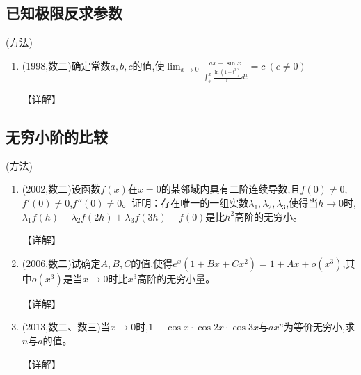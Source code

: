 \documentclass[12pt, a4paper, oneside, UTF8]{ctexbook}
\begin{document}
\subsection{已知极限反求参数}
\begin{remark}(方法)

\end{remark}

\begin{enumerate}[label=\arabic*.,start=11]
    \item  (1998,数二)确定常数$a,b,c$的值,使$\lim_{x\to0}\frac{ax-\sin x}{\int_b^x\frac{\ln(1+t^3)}{t}dt}=c\ (c\neq0)$
    
    \begin{solution}
    【详解】
    \end{solution}
\end{enumerate}

\subsection{无穷小阶的比较}
\begin{remark}(方法)
\end{remark}
\begin{enumerate}[label=\arabic*.,start=12]
    \item  (2002,数二)设函数$f(x)$在$x=0$的某邻域内具有二阶连续导数,且$f(0)\neq0$,$f'(0)\neq0$,$f''(0)\neq0$。证明：存在唯一的一组实数$\lambda_1,\lambda_2,\lambda_3$,使得当$h\to0$时,$\lambda_1f(h)+\lambda_2f(2h)+\lambda_3f(3h)-f(0)$是比$h^2$高阶的无穷小。
    
    \begin{solution}
    【详解】
    \end{solution}
    
    \item  (2006,数二)试确定$A,B,C$的值,使得$e^x(1+Bx+Cx^2)=1+Ax+o(x^3)$,其中$o(x^3)$是当$x\to0$时比$x^3$高阶的无穷小量。
    
    \begin{solution}
    【详解】
    \end{solution}
    
    \item  (2013,数二、数三)当$x\to0$时,$1-\cos x\cdot\cos2x\cdot\cos3x$与$ax^n$为等价无穷小,求$n$与$a$的值。
    
    \begin{solution}
    【详解】
    \end{solution}
\end{enumerate}
\end{document}
